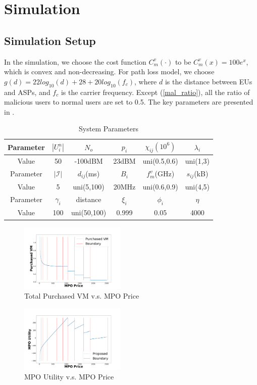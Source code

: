 \documentclass[conference]{IEEEtran}
\begin{document}
\section{Simulation} \label{sec:simulation}
\subsection{Simulation Setup}
In the simulation, we choose the cost function $C_m^v(\cdot)$ to be $C_m^v(x) = 100e^x$, which is convex and non-decreasing. For path loss model, we choose $g(d)=22log_{10}(d)+28+20log_{10}(f_c)$, where $d$ is the distance between EUs and ASPs, and $f_c$ is the carrier frequency. Except (\ref{mal_ratio}), all the ratio of malicious users to normal users are set to 0.5. The key parameters are presented in .
\begin{table}[!htb]
\caption{System Parameters}
\begin{tabular}{|c|c|c|c|c|c|}
\hline
Parameter & $|U_i^n|$ &$N_o$ & $p_i$ &$\chi_{ij}(10^6)$&$\lambda_i$ \\ \hline
Value     & 50 & -100dBM & 23dBM &uni(0.5,0.6)  & uni(1,3) \\ \hline
Parameter &$|\mathcal{I}|$& $d_{ij}$(ms) &$B_i$ &$f_m^v$(GHz)&$s_{ij}$(kB) \\ \hline
Value     &5&uni(5,100)&20MHz&uni(0.6,0.9)&uni(4,5)\\ \hline
Parameter &$\gamma_i$&distance&$\xi_i$&$\phi_i$ &$\eta$  \\ \hline
Value     &100&uni(50,100)&0.999&0.05&4000\\ \hline
\end{tabular}
\label{parameterlist}
\end{table}

    \begin{figure}
      \includegraphics[width=0.45\textwidth]{5GDDoS_Game_vm_number.pdf}
      \caption{Total Purchased VM v.s. MPO Price}
      \label{subfig-1:VMnum}
    \end{figure}
    
    \begin{figure}
      \includegraphics[width=0.45\textwidth]{5GDDoS_Game_utility.pdf}
    \caption{MPO Utility v.s. MPO Price}
    \label{subfig-2:MPOutil}
    \end{figure}
    
\end{document}
